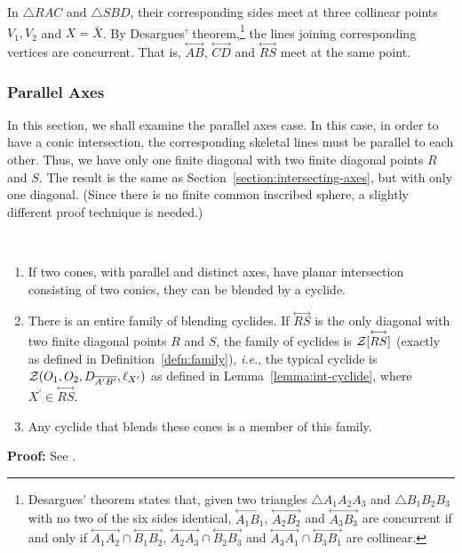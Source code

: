      In $\bigtriangleup RAC$ and $\bigtriangleup SBD$, their corresponding 
sides meet at three collinear points $V_1, V_2$ and $X=\bar{X}$.  By
Desargues' theorem,\footnote{Desargues' theorem \cite{johnson:1929} states 
	that, given two triangles $\bigtriangleup A_1A_2A_3$ and 
	$\bigtriangleup B_1B_2B_3$ with no two of the six sides identical,
	$\stackrel{\longleftrightarrow}{A_1B_1}$,
	$\stackrel{\longleftrightarrow}{A_2B_2}$ and
	$\stackrel{\longleftrightarrow}{A_3B_3}$ are concurrent if and only if
	$\stackrel{\longleftrightarrow}{A_1A_2}\cap\stackrel{\longleftrightarrow}{B_1B_2}$,
	$\stackrel{\longleftrightarrow}{A_2A_3}\cap\stackrel{\longleftrightarrow}{B_2B_3}$ and
	$\stackrel{\longleftrightarrow}{A_3A_1}\cap\stackrel{\longleftrightarrow}{B_3B_1}$
	are collinear.} 
the lines joining corresponding vertices are concurrent.
That is, $\stackrel{\longleftrightarrow}{AB}$,
$\stackrel{\longleftrightarrow}{CD}$ and $\stackrel{\longleftrightarrow}{RS}$
meet at the same point.
\QED

\subsubsection{Parallel Axes}
\label{section:cyc:parallel-axes}

     In this section, we shall examine the parallel axes case.  
In this case, in order to have a conic intersection, the 
corresponding skeletal lines must be parallel to each other. 
Thus, we have only one finite diagonal with two finite diagonal points $R$ 
and $S$.  
The result is the same as Section~\ref{section:intersecting-axes},
but with only one diagonal.
(Since there is no finite common inscribed sphere, a slightly different proof
technique is needed.)

\begin{lemma}
\label{lemma:para-cyclide}\ 
\begin{enumerate}
\item
     If two cones, with parallel and distinct axes,
have planar intersection consisting of two conics, 
they can be blended by a cyclide.
\item
     There is an entire family of blending cyclides.
If $\stackrel{\longleftrightarrow}{RS}$ is the only diagonal with two finite
diagonal points $R$ and $S$, the family of cyclides is 
${\cal Z}[\stackrel{\longleftrightarrow}{RS}]$ (exactly as defined in 
Definition~\ref{defn:family}), {\it i.e.}, the typical cyclide is
${\cal Z}(O_1,O_2,D_{\overline{A^\prime B^\prime}},\ell_{X^\prime})$
as defined in Lemma~\ref{lemma:int-cyclide}, where 
$X^\prime \in \stackrel{\longleftrightarrow}{RS}$.
\item
	Any cyclide that blends these cones is a member of this family.
\end{enumerate}
\end{lemma}
{\bf Proof:}  
See \cite[Lemmas~5.15 and 5.16]{shenethesis}.
\QED

